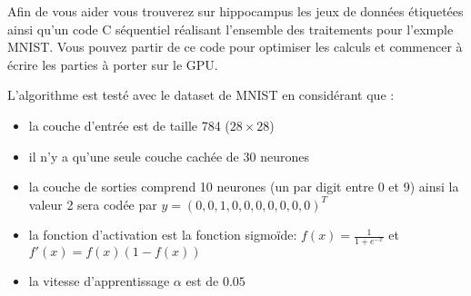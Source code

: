 \documentclass[11pt]{paper}
\begin{document}
Afin de vous aider vous trouverez sur hippocampus les jeux de données étiquetées ainsi qu'un code C séquentiel réalisant l'ensemble des traitements pour l'exmple MNIST. Vous pouvez partir de ce code pour optimiser les calculs et commencer à écrire les parties à porter sur le GPU.

L'algorithme est testé avec le dataset de MNIST en considérant que :
\begin{itemize}
	\item la couche d'entrée est de taille 784 ($28\times28$)
	\item il n'y a qu'une seule couche cachée de 30 neurones
	\item la couche de sorties comprend 10 neurones (un par digit entre 0 et 9) ainsi la valeur 2 sera codée par $y = (0,0,1,0,0,0,0,0,0,0)^T$
	\item la fonction d'activation est la fonction sigmoïde: $f(x) = \frac{1}{1+e^{-x}}$  et $f'(x) = f(x)(1-f(x))$ 
	\item la vitesse d'apprentissage $\alpha$ est de $0.05$
\end{itemize}
\end{document}
